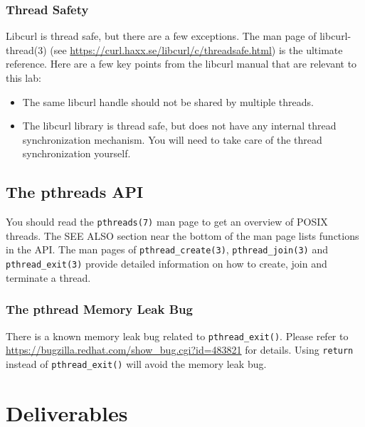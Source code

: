 \subsubsection{Thread Safety}
\label{sec:libcurl-thread-safety}

Libcurl is thread safe, but there are a few exceptions. The man page of libcurl-thread(3) (see \url{https://curl.haxx.se/libcurl/c/threadsafe.html}) is the ultimate reference. Here are a few key points from the libcurl manual that are relevant to this lab:
\begin{itemize}
\item The same libcurl handle should not be shared by multiple threads. 
\item The libcurl library is thread safe, but does not have any internal thread synchronization mechanism. You will need to take care of the thread synchronization yourself.
\end{itemize}


\subsection{The pthreads API}
\label{sec:pthreads}
You should read the \verb+pthreads(7)+ man page to get an overview of POSIX threads. The SEE ALSO section near the bottom of the man page lists functions in the API. The man pages of \verb+pthread_create(3)+, \verb+pthread_join(3)+ and \verb+pthread_exit(3)+ provide detailed information on how to create, join and terminate a thread.

\subsubsection{The pthread Memory Leak Bug}
\label{sec:pthread-memory-leak}

There is a known memory leak bug related to \verb+pthread_exit()+. Please refer to  \url{https://bugzilla.redhat.com/show_bug.cgi?id=483821} for details. Using \verb+return+ instead of \verb+pthread_exit()+ will avoid the memory leak bug.

\section{Deliverables}

